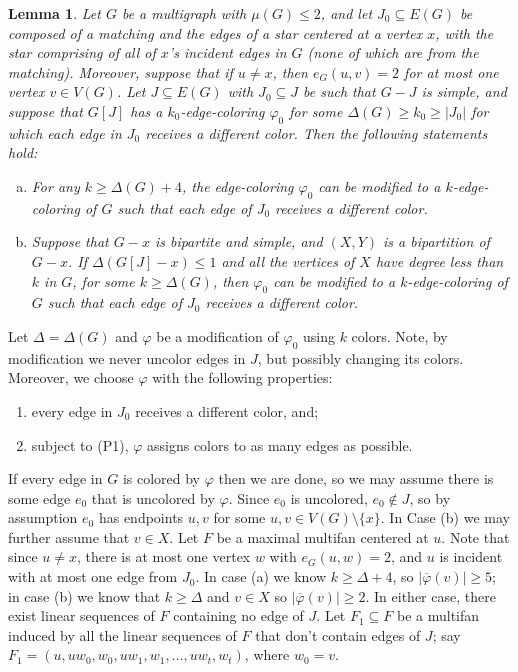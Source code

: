 \documentclass[11pt, oneside]{article}
\newcommand{\pbar}{\overline{\varphi}}
\newtheorem{lemma}[theorem]{Lemma}
\begin{document}
\begin{lemma}\label{lemma:matching-extension}
Let $G$ be a multigraph with $\mu(G) \le 2$,  and let $J_0\subseteq E(G)$ be composed of a matching and the edges of a star centered at a vertex $x$, with the star comprising of all of $x$'s incident edges in $G$ (none of which are from the matching). Moreover, suppose that if $u\neq x$, then $e_G(u, v)=2$ for at most one vertex $v\in V(G)$. Let $J\subseteq E(G)$  with $J_0\subseteq J$ be such that $G-J$ is simple, and suppose that   $G[J]$ has a $k_0$-edge-coloring $\varphi_0$ for some $ \Delta(G)\ge k_0 \ge |J_0|$ for which each edge in $J_0$ receives a different color. Then the following statements hold:
    \begin{enumerate}[(a)]
        \item For any $k\ge \Delta(G)+4$, the edge-coloring   $\varphi_0$ can be  modified  to a $k$-edge-coloring of $G$ such that each edge of $J_0$ receives a different color.  
        \item Suppose that   $G-x$ is bipartite and simple, and $(X,Y)$ is  a bipartition of $G-x$.  If  $\Delta(G[J]-x) \le 1$ and all the vertices of $X$ have degree less than $k$ in $G$, for some $k\geq \Delta(G)$,  then $\varphi_0$ can be  modified  to a $k$-edge-coloring of $G$ such that each edge of $J_0$ receives a different color. 
    \end{enumerate}
\end{lemma}

\proof 
Let $\Delta=\Delta(G)$ and $\varphi$ be a modification of $\varphi_0$ using $k$ colors. Note, by modification we never uncolor edges in $J$, but possibly changing its colors. Moreover, we choose $\varphi$ with the following properties:
\begin{enumerate}
\item[(P1)] every edge in $J_0$ receives a different color, and;
\item[(P2)] subject to (P1), $\varphi$ assigns colors to as many edges as possible.
\end{enumerate}
If every edge in $G$ is colored by $\varphi$ then we are done, so we may assume there is some edge $e_0$ that is uncolored by $\varphi$. Since $e_0$ is uncolored, $e_0\notin J$, so by assumption $e_0$ has endpoints $u,v$ for some $u, v\in V(G)\setminus\{x\}$. In Case (b) we may further assume that $v\in X$. Let $F$ be a maximal multifan centered at $u$. Note that since $u\neq x$, there is at most one vertex $w$ with $e_G(u,w)=2$, and $u$ is incident with at most one edge from $J_0$.  In case (a) we know $k\geq \Delta+4$, so $|\pbar(v)|\geq 5$; in case (b) we know that $k\geq \Delta$ and $v\in X$ so $|\pbar(v)|\geq 2$. In either case, 
there exist  linear sequences of $F$ containing no edge of $J$. Let $F_1\subseteq F$ be a multifan induced by all the linear sequences of $F$ that don't contain edges of $J$; say  $F_1=(u, uw_0, w_0,  uw_1, w_1, \ldots,  uw_t, w_t)$,  where $w_0=v$. 
\end{document}
